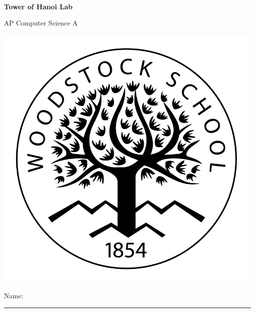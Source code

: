 
\usepackage[utf8]{inputenc}

\def\LabCourse{AP Computer Science A}
\def\LabNumber{07}
\def\LabTitle{Tower of Hanoi Lab}


	\begin{coverpages}
		\ \\[2cm]
		\begin{center}
			\huge
			\textbf{\LabTitle}

			\Large
			\LabCourse
		\end{center}

		\vspace{1.5cm}

		\begin{center}
			\includegraphics[scale=0.45]{graphics/logo_black}

			\vspace{2.5cm}

			\Large
			Name: \rule{11.5cm}{0.1pt}
		\end{center}
	\end{coverpages}

	\blankpage

	\thispagestyle{empty}
	\tableofcontents

	\pagebreak

